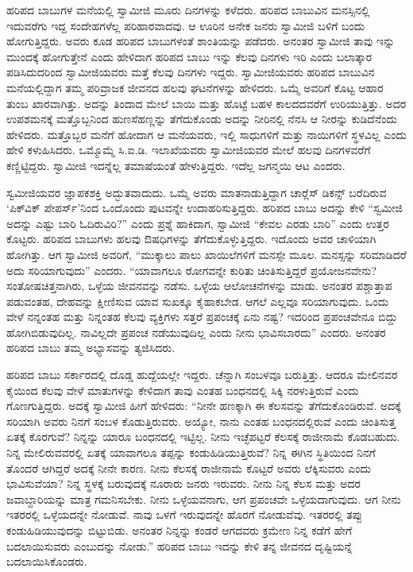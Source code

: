  ಹರಿಪದ ಬಾಬುಗಳ ಮನೆಯಲ್ಲಿ ಸ್ವಾಮೀಜಿ ಮೂರು ದಿನಗಳನ್ನು ಕಳೆದರು. ಹರಿಪದ ಬಾಬುವಿನ ಮನಸ್ಸಿನಲ್ಲಿ ಇದುವರೆಗು ಇದ್ದ ಸಂದೇಹಗಳೆಲ್ಲ ಪರಿಹಾರವಾದವು. ಆ ಊರಿನ ಅನೇಕ ಜನರು ಸ್ವಾಮೀಜಿ ಬಳಿಗೆ ಬಂದು ಹೋಗುತ್ತಿದ್ದರು. ಅವರು ಕೂಡ ಹರಿಪದ ಬಾಬುಗಳಂತೆ ಶಾಂತಿಯನ್ನು ಪಡೆದರು. ಅನಂತರ ಸ್ವಾಮೀಜಿ ತಾವು ಇನ್ನು ಮುಂದಕ್ಕೆ ಹೋಗುತ್ತೇನೆ ಎಂದು ಹೇಳಿದಾಗ ಹರಿಪದ ಬಾಬು ಇನ್ನು ಕೆಲವು ದಿನಗಳು ಇರಿ ಎಂದು ಬಲಾತ್ಕಾರ ಪಡಿಸಿದುದರಿಂದ ಸ್ವಾಮೀಜಿಯವರು ಮತ್ತೆ ಕೆಲವು ದಿನಗಳು ಇದ್ದರು. ಸ್ವಾಮೀಜಿಯವರು ಹರಿಪದ ಬಾಬುವಿನ ಮನೆಯಲ್ಲಿದ್ದಾಗ ತಮ್ಮ ಪರಿವ್ರಾಜಕ ಜೀವನದ ಹಲವು ಘಟನೆಗಳನ್ನು ಹೇಳಿದರು. ಒಮ್ಮೆ ಅವರಿಗೆ ಕೊಟ್ಟ ಆಹಾರ ತುಂಬ ಖಾರವಾಗಿತ್ತು. ಅದನ್ನು ತಿಂದಾದ ಮೇಲೆ ಬಾಯಿ ಮತ್ತು ಹೊಟ್ಟೆ ಬಹಳ ಕಾಲದದವರೆಗೆ ಉರಿಯುತ್ತಿತ್ತು. ಅದರ ಉಪಶಮನಕ್ಕೆ ಮತ್ತೊಬ್ಬನಿಂದ ಹುಣಸೆಹಣ್ಣನ್ನು ತೆಗೆದುಕೊಂಡು ಅದನ್ನು ನೀರಿನಲ್ಲಿ ನೆನಸಿ ಆ ನೀರನ್ನು ಕುಡಿದೆನೆಂದು ಹೇಳಿದರು. ಮತ್ತೊಬ್ಬರ ಮನೆಗೆ ಹೋದಾಗ ಆ ಮನೆಯವರು, ಇಲ್ಲಿ ಸಾಧುಗಳಿಗೆ ಮತ್ತು ನಾಯಿಗಳಿಗೆ ಸ್ಥಳವಿಲ್ಲ ಎಂದು ಹೇಳಿ ಕಳುಹಿಸಿದರು. ಒಮ್ಮೊಮ್ಮೆ ಸಿ.ಐ.ಡಿ. ಇಲಾಖೆಯವರು ಸ್ವಾಮೀಜಿಯವರ ಮೇಲೆ ಹಲವು ದಿನಗಳವರೆಗೆ ಕಣ್ಣಿಟ್ಟಿದ್ದರು. ಸ್ವಾಮೀಜಿ ಇದನ್ನೆಲ್ಲ ತಮಾಷೆಯಂತೆ ಹೇಳುತ್ತಿದ್ದರು. ಇದೆಲ್ಲ ಜಗನ್ಮಯಿ ಆಟ ಎಂದರು. 

 ಸ್ವಮೀಜಿಯವರ ಜ್ಞಾಪಕಶಕ್ತಿ ಅದ್ಭುತವಾದುದು. ಒಮ್ಮೆ ಅವರು ಮಾತನಾಡುತ್ತಿದ್ದಾಗ ಚಾರ‍್ಲೆಸ್ ಡಿಕನ್ಸ್ ಬರೆದಿರುವ ‘ಪಿಕ್‍ವಿಕ್ ಪೇಪರ್ಸ್’ನಿಂದ ಒಂದೊಂದು ಪುಟವನ್ನೇ ಉದಾಹರಿಸುತ್ತಿದ್ದರು. ಹರಿಪದ ಬಾಬು ಅದನ್ನು ಕೇಳಿ “ಸ್ವಮೀಜಿ ಅದನ್ನು ಎಷ್ಟು ಬಾರಿ ಓದಿರುವಿರಿ?” ಎಂದು ಪ್ರಶ್ನೆ ಹಾಕಿದಾಗ, ಸ್ವಾಮೀಜಿ “ಕೇವಲ ಎರಡು ಬಾರಿ” ಎಂದು ಉತ್ತರ ಕೊಟ್ಟರು. ಹರಿಪದ ಬಾಬುಗಳು ಹಲವು ಔಷಧಿಗಳನ್ನು ತೆಗೆದುಕೊಳ್ಳುತ್ತಿದ್ದರು. ಇದೊಂದು ಅವರ ಚಾಳಿಯಾಗಿ ಹೋಗಿತ್ತು. ಆಗ ಸ್ವಾಮೀಜಿ ಅವರಿಗೆ, “ಮುಕ್ಕಾಲು ಪಾಲು ಖಾಯಿಲೆಗಳಿಗೆ ಮನಸ್ಸೇ ಮೂಲ. ಮನಸ್ಸನ್ನು ಸರಿಮಾಡಿದರೆ ಅದು ಸರಿಯಾಗುವುದು” ಎಂದರು. “ಯಾವಾಗಲೂ ರೋಗವನ್ನೇ ಕುರಿತು ಚಿಂತಿಸುತ್ತಿದ್ದರೆ ಪ್ರಯೋಜನವೇನು? ಸಂತೋಷಚಿತ್ತನಾಗಿರು, ಒಳ್ಳೆಯ ಜೀವನವನ್ನು ನಡೆಸು. ಒಳ್ಳೆಯ ಆಲೋಚನೆಗಳನ್ನು ಮಾಡು. ಅನಂತರ ಪಶ್ಚಾತ್ತಾಪ ಪಡುವಂತಹ, ದೇಹವನ್ನು ಕ್ಷೀಣಿಸುವ ಯಾವ ಸುಖಕ್ಕೂ ಕೈಹಾಕಬೇಡ. ಆಗಲೆ ಎಲ್ಲವೂ ಸರಿಯಾಗುವುದು. ಒಂದು ವೇಳೆ ನನ್ನಂತಹ ಮತ್ತು ನಿನ್ನಂತಹ ಕೆಲವು ವ್ಯಕ್ತಿಗಳು ಸತ್ತರೆ ಪ್ರಪಂಚಕ್ಕೆ ಏನು ನಷ್ಟ? ಇದರಿಂದ ಪ್ರಪಂಚವೇನೂ ಬಿದ್ದು ಹೋಗಿಬಿಡುವುದಿಲ್ಲ. ನಾವಿಲ್ಲದೇ ಪ್ರಪಂಚ ನಡೆಯುವುದಿಲ್ಲ ಎಂದು ನೀನು ಭಾವಿಸಬಾರದು” ಎಂದರು. ಅನಂತರ ಹರಿಪದ ಬಾಬು ತಮ್ಮ ಅಭ್ಯಾಸವನ್ನು ತ್ಯಜಿಸಿದರು. 

 ಹರಿಪದ ಬಾಬು ಸರ್ಕಾರದಲ್ಲಿ ದೊಡ್ಡ ಹುದ್ದೆಯಲ್ಲೇ ಇದ್ದರು. ಚೆನ್ನಾಗಿ ಸಂಬಳವೂ ಬರುತ್ತಿತ್ತು. ಆದರೂ ಮೇಲಿನವರ ಕೈಯಿಂದ ಕೆಲವು ವೇಳೆ ಮಾತುಗಳನ್ನು ಕೇಳಿದಾಗ ತಾವು ಎಂತಹ ಬಂಧನದಲ್ಲಿ ಸಿಕ್ಕಿ ನರಳುತ್ತಿರುವೆ ಎಂದು ಗೊಣಗುತ್ತಿದ್ದರು. ಅದಕ್ಕೆ ಸ್ವಾಮೀಜಿ ಹೀಗೆ ಹೇಳಿದರು: “ನೀನೇ ಹಣಕ್ಕಾಗಿ ಈ ಕೆಲಸವನ್ನು ತೆಗೆದುಕೊಂಡಿರುವೆ. ಅದಕ್ಕೆ ಸರಿಯಾಗಿ ಅವರು ನಿನಗೆ ಸಂಬಳ ಕೊಡುತ್ತಿರುವರು. ಅಯ್ಯೋ, ನಾನು ಎಂತಹ ಬಂಧನದಲ್ಲಿರುವೆ ಎಂದು ಚಿಂತಿಸುತ್ತ ಏತಕ್ಕೆ ಕೊರಗುವೆ? ನಿನ್ನನ್ನು ಯಾರೂ ಬಂಧನದಲ್ಲಿ ಇಟ್ಟಿಲ್ಲ. ನೀನು ಇಚ್ಛೆಪಟ್ಟರೆ ಕೆಲಸಕ್ಕೆ ರಾಜೀನಾಮೆ ಕೊಡಬಹುದು. ನಿನ್ನ ಮೇಲಿರುವವರಲ್ಲಿ ಏತಕ್ಕೆ ಯಾವಾಗಲೂ ತಪ್ಪನ್ನು ಕಂಡುಹಿಡಿಯುತ್ತಿರುವೆ? ನಿನ್ನ ಈಗಿನ ಸ್ಥಿತಿಯಿಂದ ನಿನಗೆ ತೊಂದರೆ ಆಗಿದ್ದರೆ ಅದಕ್ಕೆ ನೀನೇ ಕಾರಣ. ನೀನು ಕೆಲಸಕ್ಕೆ ರಾಜೀನಾಮೆ ಕೊಟ್ಟರೆ ಅವರು ಲೆಕ್ಕಿಸುವರು ಎಂದು ಭಾವಿಸುವೆಯಾ? ನಿನ್ನ ಸ್ಥಳಕ್ಕೆ ಬರುವುದಕ್ಕೆ ನೂರಾರು ಜನರು ಇರುವರು. ನೀನು ನಿನ್ನ ಕೆಲಸ ಮತ್ತು ಅದರ ಜವಾಬ್ದಾರಿಯನ್ನು ಮಾತ್ರ ಗಮನಿಸಬೇಕು. ನೀನು ಒಳ್ಳೆಯವನಾಗು, ಆಗ ಪ್ರಪಂಚವೇ ಒಳ್ಳೆಯದಾಗುವುದು. ಆಗ ನೀನು ಇತರರಲ್ಲಿ ಒಳ್ಳೆಯದನ್ನೇ ನೋಡುವೆ. ನಾವು ಒಳಗೆ ಇರುವುದನ್ನೇ ಹೊರಗೆ ನೋಡುವೆವು. ಇತರರಲ್ಲಿ ತಪ್ಪು ಕಂಡುಹಿಡಿಯುವುದನ್ನು ಬಿಟ್ಟುಬಿಡು. ಅನಂತರ ನಿನ್ನನ್ನು ಕಂಡರೆ ಆಗದವರು ಕ್ರಮೇಣ ನಿನ್ನ ಕಡೆಗೆ ಹೇಗೆ ಬದಲಾಯಿಸುವರು ಎಂಬುದನ್ನು ನೋಡು.” ಹರಿಪದ ಬಾಬು ಇದನ್ನು ಕೇಳಿ ತನ್ನ ಜೀವನದ ದೃಷ್ಟಿಯನ್ನೆ ಬದಲಾಯಿಸಿಕೊಂಡರು. 

